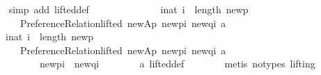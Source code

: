 \begin{isabellebody}
\ \ \ \ \ \ \isamarkupfalse%
\ {\isacharparenleft}{\kern0pt}simp\ add{\isacharcolon}{\kern0pt}\ lifted{\isacharunderscore}{\kern0pt}def{\isacharparenright}{\kern0pt}\isanewline
\ \ \ \ \isamarkupfalse%
\ \isamarkupfalse%
\ {}{\isacharcolon}{\kern0pt}\isanewline
\ \ \ \ \ \ {\isachardoublequoteopen}{\isacharparenleft}{\kern0pt}{\isasymforall}i{\isacharcolon}{\kern0pt}{\isacharcolon}{\kern0pt}nat{\isachardot}{\kern0pt}\ i\ {\isacharless}{\kern0pt}\ length\ {\isacharquery}{\kern0pt}new{\isacharunderscore}{\kern0pt}p\ {\isasymlongrightarrow}\isanewline
\ \ \ \ \ \ \ \ \ \ {\isasymnot}Preference{\isacharunderscore}{\kern0pt}Relation{\isachardot}{\kern0pt}lifted\ {\isacharquery}{\kern0pt}new{\isacharunderscore}{\kern0pt}Ap\ {\isacharparenleft}{\kern0pt}{\isacharquery}{\kern0pt}new{\isacharunderscore}{\kern0pt}p{\isacharbang}{\kern0pt}i{\isacharparenright}{\kern0pt}\ {\isacharparenleft}{\kern0pt}{\isacharquery}{\kern0pt}new{\isacharunderscore}{\kern0pt}q{\isacharbang}{\kern0pt}i{\isacharparenright}{\kern0pt}\ a{\isacharparenright}{\kern0pt}\ {\isasymor}\isanewline
\ \ \ \ \ \ \ {\isacharparenleft}{\kern0pt}{\isasymexists}i{\isacharcolon}{\kern0pt}{\isacharcolon}{\kern0pt}nat{\isachardot}{\kern0pt}\ i\ {\isacharless}{\kern0pt}\ length\ {\isacharquery}{\kern0pt}new{\isacharunderscore}{\kern0pt}p\ {\isasymand}\isanewline
\ \ \ \ \ \ \ \ \ \ {\isasymnot}Preference{\isacharunderscore}{\kern0pt}Relation{\isachardot}{\kern0pt}lifted\ {\isacharquery}{\kern0pt}new{\isacharunderscore}{\kern0pt}Ap\ {\isacharparenleft}{\kern0pt}{\isacharquery}{\kern0pt}new{\isacharunderscore}{\kern0pt}p{\isacharbang}{\kern0pt}i{\isacharparenright}{\kern0pt}\ {\isacharparenleft}{\kern0pt}{\isacharquery}{\kern0pt}new{\isacharunderscore}{\kern0pt}q{\isacharbang}{\kern0pt}i{\isacharparenright}{\kern0pt}\ a\ {\isasymand}\isanewline
\ \ \ \ \ \ \ \ \ \ \ \ \ \ {\isacharparenleft}{\kern0pt}{\isacharquery}{\kern0pt}new{\isacharunderscore}{\kern0pt}p{\isacharbang}{\kern0pt}i{\isacharparenright}{\kern0pt}\ {\isasymnoteq}\ {\isacharparenleft}{\kern0pt}{\isacharquery}{\kern0pt}new{\isacharunderscore}{\kern0pt}q{\isacharbang}{\kern0pt}i{\isacharparenright}{\kern0pt}{\isacharparenright}{\kern0pt}{\isachardoublequoteclose}\isanewline
\ \ \ \ \ \ \isamarkupfalse%
\ a{}\ lifted{\isacharunderscore}{\kern0pt}def\isanewline
\ \ \ \ \ \ \isamarkupfalse%
\ {\isacharparenleft}{\kern0pt}metis\ {\isacharparenleft}{\kern0pt}no{\isacharunderscore}{\kern0pt}types{\isacharcomma}{\kern0pt}\ lifting{\isacharparenright}{\kern0pt}{\isacharparenright}{\kern0pt}\isanewline

\end{isabellebody}
